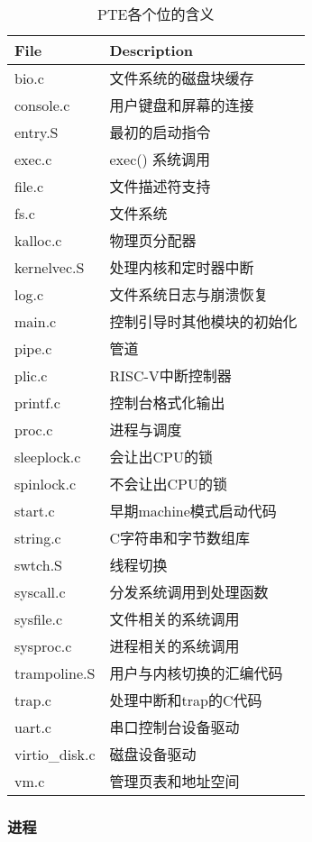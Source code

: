 \begin{table}[!hpt]
	\caption{PTE各个位的含义}
	\label{tab:xv6_files}
	\centering
	\begin{tabular}{@{}ll@{}} 		
		\toprule
		\textbf{File} & \textbf{Description} \\
		\midrule
		bio.c         & 文件系统的磁盘块缓存 \\
		console.c     & 用户键盘和屏幕的连接 \\
		entry.S       & 最初的启动指令 \\
		exec.c        & exec() 系统调用 \\
		file.c        & 文件描述符支持 \\
		fs.c          & 文件系统 \\
		kalloc.c      & 物理页分配器 \\
		kernelvec.S   & 处理内核和定时器中断 \\
		log.c         & 文件系统日志与崩溃恢复 \\
		main.c        & 控制引导时其他模块的初始化 \\
		pipe.c        & 管道 \\
		plic.c        & RISC-V中断控制器 \\
		printf.c      & 控制台格式化输出 \\
		proc.c        & 进程与调度 \\
		sleeplock.c   & 会让出CPU的锁 \\
		spinlock.c    & 不会让出CPU的锁 \\
		start.c       & 早期machine模式启动代码 \\
		string.c      & C字符串和字节数组库 \\
		swtch.S       & 线程切换 \\
		syscall.c     & 分发系统调用到处理函数 \\
		sysfile.c     & 文件相关的系统调用 \\
		sysproc.c     & 进程相关的系统调用 \\
		trampoline.S  & 用户与内核切换的汇编代码 \\ 
		trap.c        & 处理中断和trap的C代码 \\
		uart.c        & 串口控制台设备驱动 \\
		virtio\_disk.c & 磁盘设备驱动 \\
		vm.c          & 管理页表和地址空间 \\
		\bottomrule
	\end{tabular}
\end{table}

\subsubsection{进程}

